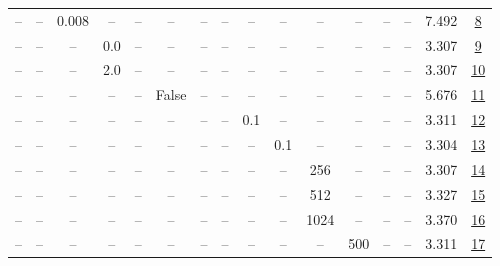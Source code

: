 \begin{table}[H]
\begin{tabular}{cccccccccccccccc}
-- & -- & 0.008 & -- & -- & -- & -- & -- & -- & -- & -- & -- & -- & -- & 7.492 & \href{https://wandb.ai/stanford-mercury/optimizer-scaling/runs/sweep-130m-10B-kroncb2f29lr0.008-wd0.5-b10.95-plr0.2-pis1-gn1-no-63a8f8}{8} \\
-- & -- & -- & 0.0 & -- & -- & -- & -- & -- & -- & -- & -- & -- & -- & 3.307 & \href{https://wandb.ai/stanford-mercury/optimizer-scaling/runs/sweep-130m-10B-krondec291lr0.002-wd0.5-b10.95-plr0.2-pis1-gn0.0--dc5daf}{9} \\
-- & -- & -- & 2.0 & -- & -- & -- & -- & -- & -- & -- & -- & -- & -- & 3.307 & \href{https://wandb.ai/stanford-mercury/optimizer-scaling/runs/sweep-130m-10B-kron848725lr0.002-wd0.5-b10.95-plr0.2-pis1-gn2.0--bf43fe}{10} \\
-- & -- & -- & -- & -- & False & -- & -- & -- & -- & -- & -- & -- & -- & 5.676 & \href{https://wandb.ai/stanford-mercury/optimizer-scaling/runs/sweep-130m-10B-kron1d44fclr0.002-wd0.5-b10.95-plr0.2-pis1-gn1-no-70d4aa}{11} \\
-- & -- & -- & -- & -- & -- & -- & -- & 0.1 & -- & -- & -- & -- & -- & 3.311 & \href{https://wandb.ai/stanford-mercury/optimizer-scaling/runs/sweep-130m-10B-kronb95d56lr0.002-wd0.5-b10.95-plr0.1-pis1-gn1-no-75ac83}{12} \\
-- & -- & -- & -- & -- & -- & -- & -- & -- & 0.1 & -- & -- & -- & -- & 3.304 & \href{https://wandb.ai/stanford-mercury/optimizer-scaling/runs/sweep-130m-10B-kron5b495flr0.002-wd0.5-b10.95-plr0.2-pis1-gn1-no-989d60}{13} \\
-- & -- & -- & -- & -- & -- & -- & -- & -- & -- & 256 & -- & -- & -- & 3.307 & \href{https://wandb.ai/stanford-mercury/optimizer-scaling/runs/sweep-130m-10B-kron45d4b7lr0.002-wd0.5-b10.95-plr0.2-pis1-gn1-no-cdf266}{14} \\
-- & -- & -- & -- & -- & -- & -- & -- & -- & -- & 512 & -- & -- & -- & 3.327 & \href{https://wandb.ai/stanford-mercury/optimizer-scaling/runs/sweep-130m-10B-kronf8119alr0.002-wd0.5-b10.95-plr0.2-pis1-gn1-no-e1c458}{15} \\
-- & -- & -- & -- & -- & -- & -- & -- & -- & -- & 1024 & -- & -- & -- & 3.370 & \href{https://wandb.ai/stanford-mercury/optimizer-scaling/runs/sweep-130m-10B-kron80879elr0.002-wd0.5-b10.95-plr0.2-pis1-gn1-no-214b96}{16} \\
-- & -- & -- & -- & -- & -- & -- & -- & -- & -- & -- & 500 & -- & -- & 3.311 & \href{https://wandb.ai/stanford-mercury/optimizer-scaling/runs/sweep-130m-10B-kron9eb75blr0.002-wd0.5-b10.95-plr0.2-pis1-gn1-no-294485}{17} \\

\end{tabular}
\end{table}
